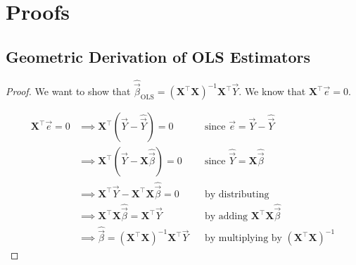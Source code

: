 \documentclass[12pt,oneside]{article}
\newcommand{\Var}{\text{Var}}
\newcommand{\OLS}{\text{OLS}}
\newcommand{\GLS}{\text{GLS}}
\theoremstyle{definition}
\theoremstyle{remark}
\begin{document}



\appendix
\section{Proofs}

\subsection{Geometric Derivation of OLS Estimators}
\label{app:ols-geom}

\begin{proof}
We want to show that $\widehat{\vec{\beta}}_{\OLS} = (\boldsymbol{X}^{\top} \boldsymbol{X})^{-1} \boldsymbol{X}^{\top} \vec{Y}$. We know that $\boldsymbol{X}^{\top} \vec{e} = 0$.

\[
\begin{aligned}
\boldsymbol{X}^{\top} \vec{e} = 0 &\implies \boldsymbol{X}^{\top} (\vec{Y} - \widehat{\vec{Y}}) = 0 && \text{since $\vec{e} = \vec{Y} - \widehat{\vec{Y}}$} \\
&\implies \boldsymbol{X}^{\top} (\vec{Y} - \boldsymbol{X} \widehat{\vec{\beta}}) = 0 && \text{since $\widehat{\vec{Y}} = \boldsymbol{X} \widehat{\vec{\beta}}$} \\
&\implies \boldsymbol{X}^{\top} \vec{Y} - \boldsymbol{X}^{\top} \boldsymbol{X} \widehat{\vec{\beta}} = 0 && 
\text{by distributing} \\
&\implies \boldsymbol{X}^{\top} \boldsymbol{X} \widehat{\vec{\beta}} = \boldsymbol{X}^{\top} \vec{Y} && 
\text{by adding $\boldsymbol{X}^{\top} \boldsymbol{X} \widehat{\vec{\beta}}$} \\
&\implies \widehat{\vec{\beta}} = (\boldsymbol{X}^{\top} \boldsymbol{X})^{-1} \boldsymbol{X}^{\top} \vec{Y} && 
\text{by multiplying by $(\boldsymbol{X}^{\top} \boldsymbol{X})^{-1}$}
\end{aligned}
\]
\end{proof}
\end{document}
